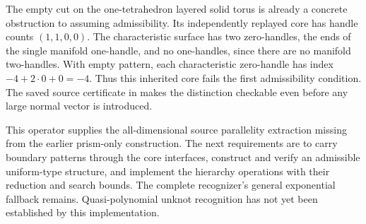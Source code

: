 The empty cut on the one-tetrahedron layered solid torus is already a
concrete obstruction to assuming admissibility. Its independently replayed
core has handle counts $(1,1,0,0)$. The characteristic surface has two
zero-handles, the ends of the single manifold one-handle, and no one-handles,
since there are no manifold two-handles. With empty pattern, each
characteristic zero-handle has index $-4+2\cdot0+0=-4$. Thus this inherited
core fails the first admissibility condition. The saved source certificate
in  makes the distinction
checkable even before any large normal vector is introduced.

This operator supplies the all-dimensional source parallelity extraction
missing from the earlier prism-only construction. The next requirements are
to carry boundary patterns through the core interfaces, construct and verify
an admissible uniform-type structure, and implement the hierarchy operations
with their reduction and search bounds. The complete recognizer's general
exponential fallback remains. Quasi-polynomial unknot recognition has not
yet been established by this implementation.
